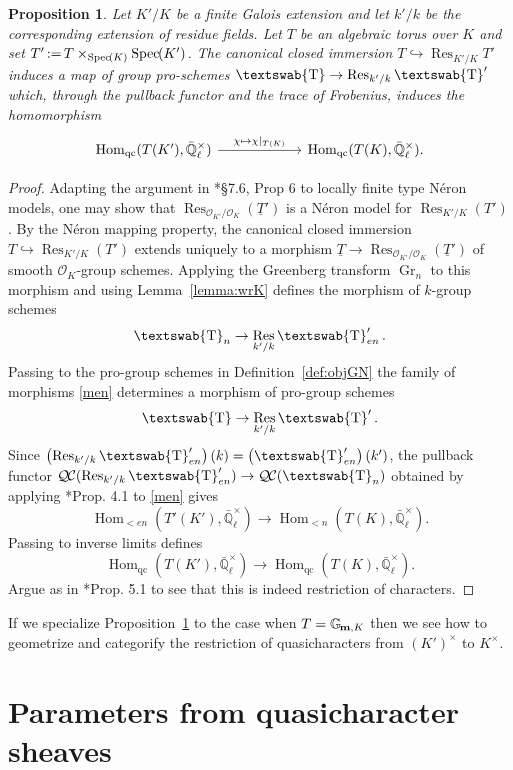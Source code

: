 \documentclass{amsart}
\theoremstyle{plain}
\newtheorem{proposition}[theorem]{Proposition}
\theoremstyle{definition}
\theoremstyle{remark}
\newcommand{\EE}{\mathbb{\bar Q}_\ell}
\newcommand{\OK}{\mathcal{O}_K}
\newcommand{\OKp}{\mathcal{O}_{K'}}
\newcommand{\Fq}{k}
\newcommand{\EEx}{\EE^\times}
\newcommand{\mathswab}[1]{\operatorname{\textswab{#1}}}
\newcommand{\Gm}[1]{\mathbb{G}_{\hskip-1pt\textbf{m},#1}}
\newcommand{\GN}[1]{\mathswab{#1}}
\newcommand{\TTp}{\underline{T}'}
\DeclareMathOperator{\Hom}{Hom}
\DeclareMathOperator{\Gr}{Gr}
\DeclareMathOperator{\Res}{Res}
\newcommand{\Spec}[1]{{\operatorname{Spec}\hskip-1pt( #1 )}}
\newcommand{\ceq}{{\, :=\, }}
\newcommand{\QC}{{\mathcal{Q\hskip-0.8pt C}}}
\begin{document}
\begin{proposition}\label{prop:wrK}
Let $K'/K$ be a finite Galois extension and
let $k'/k$ be the corresponding extension of residue fields.
Let $T$ be an algebraic torus over $K$ and
set $T' \ceq T \times_\Spec{K} \Spec{K'}$.
The canonical closed immersion $T \hookrightarrow \Res_{K'/K} T'$
induces a map of group pro-schemes $\GN{T} \to \Res_{k'/k} \GN{T}'$ which,
through the pullback functor and the trace of Frobenius, induces the homomorphism
\[
\begin{tikzcd}[column sep=60]
\Hom_{\text{qc}}(T(K'), \EEx) \arrow{r}{\chi \mapsto \chi\vert_{T(K)}} &\Hom_{\text{qc}}(T(K), \EEx).
\end{tikzcd}
\]
\end{proposition}

\begin{proof}
Adapting the argument in \cite{bosch-lutkebohmert-reynaud:NeronModels}*{\S 7.6, Prop 6} to locally finite type Néron models,
one may show that $\Res_{\OKp/\OK}(\TTp)$ is a Néron model for $\Res_{K'/K}(T')$.
By the Néron mapping property, the canonical closed immersion
$T\hookrightarrow \Res_{K'/K}(T')$ extends uniquely to a morphism
$\underline{T}\to \Res_{\OKp/\OK}(\TTp)$ of smooth $\OK$-group schemes.
Applying the Greenberg transform $\Gr_{n}$ to this morphism
and using Lemma~\ref{lemma:wrK} defines the morphism of $\Fq$-group schemes
\begin{equation}\label{men}
\GN{T}_n \to \Res_{k'/k} \GN{T}'_{en}.
\end{equation}
Passing to the pro-group schemes in Definition~\ref{def:objGN}
the family of morphisms \eqref{men} determines a morphism of pro-group schemes
\[
\GN{T} \to \Res_{k'/k} \GN{T}'.
\]
Since $\left(\Res_{k'/k} \GN{T}'_{en} \right)(\Fq) = \left(\GN{T}'_{en}\right)(k')$,
the pullback functor $\QC(\Res_{k'/k} \GN{T}'_{en})\to \QC(\GN{T}_n)$
obtained by applying \cite{cunningham-roe:dictionary}*{Prop. 4.1} to \eqref{men} gives
\[
\Hom_{< en}(T'(K'),\EEx) \to \Hom_{< n}(T(K),\EEx).
\]
Passing to inverse limits defines
\[
\Hom_{\text{qc}}(T(K'),\EEx) \to \Hom_{\text{qc}}(T(K),\EEx).
\]
Argue as in \cite{cunningham-roe:dictionary}*{Prop. 5.1} to see that this is indeed restriction of characters.
\end{proof}

If we specialize Proposition~\ref{prop:wrK} to the case when
$T = \Gm{K}$ then we see how to geometrize and categorify the restriction of quasicharacters from $(K')^\times$ to $K^\times$.


\section{Parameters from quasicharacter sheaves}
\end{document}
